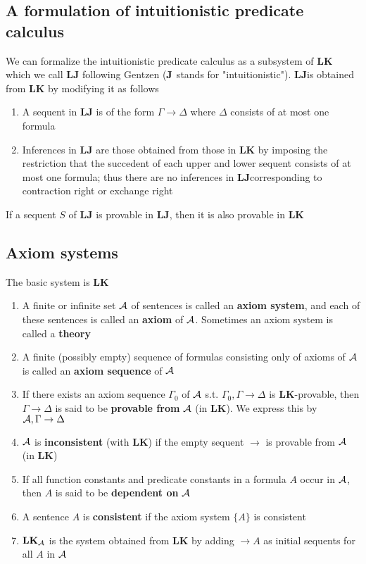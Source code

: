 \documentclass[11pt]{article}
\def \LJ {\textbf{LJ}}
\def \LK {\textbf{LK}}
\begin{document}
\subsection{A formulation of intuitionistic predicate calculus}
\label{sec:orgc35ace0}
\begin{definition}[]
We can formalize the intuitionistic predicate calculus as a subsystem of
\(\LK\) which we call \(\LJ\) following Gentzen (\(\operatorname{\textbf{J}}\) stands for
"intuitionistic"). \(\LJ\)is obtained from \(\LK\) by modifying it as follows
\begin{enumerate}
\item A sequent in \(\LJ\) is of the form \(\Gamma \to \Delta\) where \(\Delta\) consists of at most
one formula
\item Inferences in \(\LJ\) are those obtained from those in \(\LK\) by imposing
the restriction that the succedent of each upper and lower sequent
consists of at most one formula; thus there are no inferences in
\(\LJ\)corresponding to contraction right or exchange right
\end{enumerate}
\end{definition}

\begin{proposition}[]
If a sequent \(S\) of \(\LJ\) is provable in \(\LJ\), then it is also
provable in \(\LK\)
\end{proposition}

\subsection{Axiom systems}
\label{sec:org0108804}
\begin{definition}[]
The basic system is \(\LK\)
\begin{enumerate}
\item A finite or infinite set \(\mathcal{A}\) of sentences is called an \textbf{axiom system},
and each of these sentences is called an \textbf{axiom} of \(\mathcal{A}\). Sometimes an
axiom system is called a \textbf{theory}
\item A finite (possibly empty) sequence of formulas consisting only of axioms
of \(\mathcal{A}\) is called an \textbf{axiom sequence} of \(\mathcal{A}\)
\item If there exists an axiom sequence \(\Gamma_0\) of \(\mathcal{A}\) s.t.
\(\Gamma_0,\Gamma\to\Delta\) is \(\LK\)-provable, then \(\Gamma \to \Delta\) is
said to be \textbf{provable from} \(\mathcal{A}\) (in \(\LK\)). We express this by \(\mathcal{A},\Gamma\to\Delta\)
\item \(\mathcal{A}\) is \textbf{inconsistent} (with \(\LK\)) if the empty sequent \(\to\) is
provable from \(\mathcal{A}\) (in \(\LK\))
\item If all function constants and predicate constants in a formula \(A\) occur
in \(\mathcal{A}\), then \(A\) is said to be \textbf{dependent on} \(\mathcal{A}\)
\item A sentence \(A\) is \textbf{consistent} if the axiom system \(\{A\}\) is consistent
\item \(\LK_{\cala}\) is the system obtained from \(\LK\) by adding \(\to A\) as
initial sequents for all \(A\) in \(\mathcal{A}\)
\end{enumerate}
\end{definition}
\end{document}
